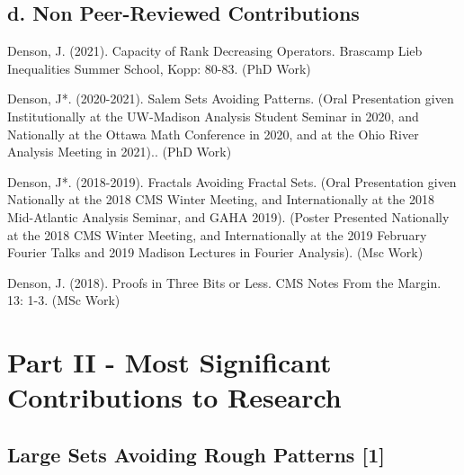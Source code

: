 \documentclass[12pt]{article}
\theoremstyle{plain}
\theoremstyle{remark}
\theoremstyle{definition}
\begin{document}

\subsection*{d. Non Peer-Reviewed Contributions}

\begin{thebibliography}{9}

\makeatletter
\addtocounter{\@listctr}{3}
\makeatother

Denson, J. (2021). Capacity of Rank Decreasing Operators. Brascamp Lieb Inequalities Summer School, Kopp: 80-83. (PhD Work)


Denson, J*. (2020-2021). Salem Sets Avoiding Patterns. (Oral Presentation given Institutionally at the UW-Madison Analysis Student Seminar in 2020, and Nationally at the Ottawa Math Conference in 2020, and at the Ohio River Analysis Meeting in 2021).. (PhD Work)

Denson, J*. (2018-2019). Fractals Avoiding Fractal Sets. (Oral Presentation given Nationally at the 2018 CMS Winter Meeting, and Internationally at the 2018 Mid-Atlantic Analysis Seminar, and GAHA 2019). (Poster Presented Nationally at the 2018 CMS Winter Meeting, and Internationally at the 2019 February Fourier Talks and 2019 Madison Lectures in Fourier Analysis). (Msc Work)

Denson, J. (2018). Proofs in Three Bits or Less. CMS Notes From the Margin. 13: 1-3. (MSc Work)

\end{thebibliography}

\section*{Part II - Most Significant Contributions to Research}


\subsection*{Large Sets Avoiding Rough Patterns [1]}
\end{document}
